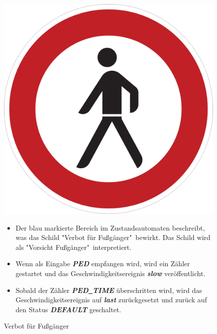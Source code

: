 \begin{figure}[h]
\begin{minipage}[t]{4cm}
\vspace{0pt}
\centering
\includegraphics[scale=0.07]{images/PED.jpg}
\caption{Verbot f\"ur Fu\ss{}g\"anger}
\label{fig:PED}
\end{minipage}
\hfill
\begin{minipage}[t]{10cm}
\vspace{0pt}
\begin{itemize}
\item Der blau markierte Bereich im Zustandsautomaten beschreibt, was das Schild "Verbot f\"ur Fu\ss{}g\"anger"\ bewirkt. Das Schild wird als "Vorsicht Fu\ss{}g\"anger"\  interpretiert.

\item Wenn als Eingabe \textbf{\textit{PED}} empfangen wird, wird ein Z\"ahler gestartet und das Geschwindigkeitsereignis \textbf{\textit{slow}} ver\"offentlicht.

\item Sobald der Z\"ahler \textbf{\textit{PED\underline{\ }TIME}} \"uberschritten wird, wird das Geschwindigkeitsereignis auf \textbf{\textit{last}} zur\"uckgesetzt und zur\"uck auf den Status \textbf{\textit{DEFAULT}} geschaltet.
\end{itemize}
\end{minipage}
\end{figure}



